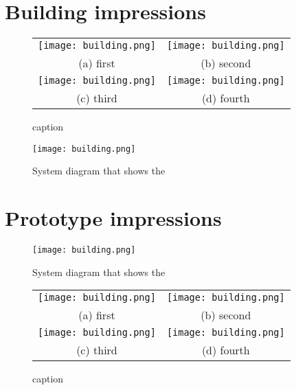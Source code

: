 \begin{appendices}
\section{Building impressions}
\label{appendix:building}

\begin{figure}[H]
\begin{minipage}{.5\textwidth}
\begin{tabular}{cc}
  \texttt{[image: building.png]} &   \texttt{[image: building.png]} \\
(a) first & (b) second \\[6pt]
 \texttt{[image: building.png]} &   \texttt{[image: building.png]} \\
(c) third & (d) fourth \\[6pt]
\end{tabular}
\caption{caption}
\end{minipage}%
\begin{minipage}{.5\textwidth}
    \centering
    \texttt{[image: building.png]}
    \caption{System diagram that shows the }
    \label{fig:timeline}
\end{minipage}%
\end{figure}

\section{Prototype impressions}
\label{appendix:prototype}

\begin{figure}[H]
\begin{minipage}{.5\textwidth}
    \centering
    \texttt{[image: building.png]}
    \caption{System diagram that shows the }
    \label{fig:timeline}
\end{minipage}%
\begin{minipage}{.5\textwidth}
\begin{tabular}{cc}
  \texttt{[image: building.png]} &   \texttt{[image: building.png]} \\
(a) first & (b) second \\[6pt]
 \texttt{[image: building.png]} &   \texttt{[image: building.png]} \\
(c) third & (d) fourth \\[6pt]
\end{tabular}
\caption{caption}
\end{minipage}%
\end{figure}


\end{appendices}
